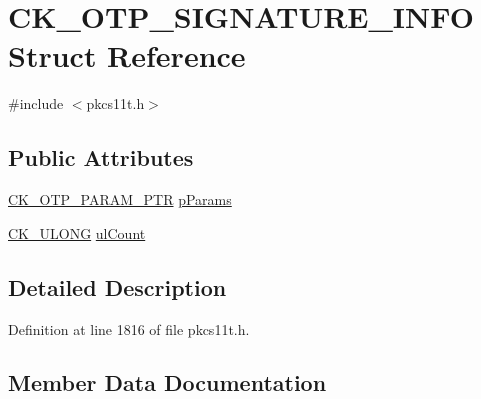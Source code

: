 \hypertarget{struct_c_k___o_t_p___s_i_g_n_a_t_u_r_e___i_n_f_o}{}\section{C\+K\+\_\+\+O\+T\+P\+\_\+\+S\+I\+G\+N\+A\+T\+U\+R\+E\+\_\+\+I\+N\+FO Struct Reference}
\label{struct_c_k___o_t_p___s_i_g_n_a_t_u_r_e___i_n_f_o}


{\ttfamily \#include $<$pkcs11t.\+h$>$}

\subsection*{Public Attributes}
\begin{DoxyCompactItemize}
\item 
\hyperlink{pkcs11t_8h_a520ae5ec458e07a78dd1f869974e6b98}{C\+K\+\_\+\+O\+T\+P\+\_\+\+P\+A\+R\+A\+M\+\_\+\+P\+TR} \hyperlink{struct_c_k___o_t_p___s_i_g_n_a_t_u_r_e___i_n_f_o_af797fa1af98b6da33ddba34f156143be}{p\+Params}
\item 
\hyperlink{pkcs11t_8h_a35181858a3b7a0a81f49d180d8f446ef}{C\+K\+\_\+\+U\+L\+O\+NG} \hyperlink{struct_c_k___o_t_p___s_i_g_n_a_t_u_r_e___i_n_f_o_a5b747d449bdffb39163d0d143d50711b}{ul\+Count}
\end{DoxyCompactItemize}


\subsection{Detailed Description}


Definition at line 1816 of file pkcs11t.\+h.



\subsection{Member Data Documentation}
\mbox{\label{struct_c_k___o_t_p___s_i_g_n_a_t_u_r_e___i_n_f_o_af797fa1af98b6da33ddba34f156143be}} 
